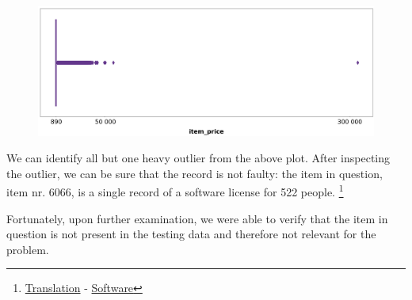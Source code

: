 \begin{figure}[h]
  \centering
  \includegraphics[width=0.9\linewidth]{external_content/graphs/outliers-item_price.png}
  \captionsetup{justification=centering}
  \label{fig:item_price_outliers}
\end{figure}

We can identify all but one heavy outlier from the above plot. After inspecting the outlier, we can be sure that the record is not faulty: the item in question, item nr. 6066, is a single record of a software license for 522 people. \footnote{\href{https://translate.google.com/?sl=ru&tl=en&text=Radmin\%203\%20\%20-\%20522\%20\%D0\%BB\%D0\%B8\%D1\%86.&op=translate }{Translation} - \href{https://www.radmin.com/ordering/}{Software}}

Fortunately, upon further examination, we were able to verify that the item in question is not present in the testing data and therefore not relevant for the problem.

